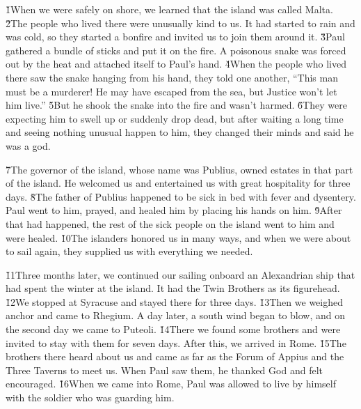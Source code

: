 \v{1}When we were safely on shore, we learned that the island was called Malta. \v{2}The people who lived there were unusually kind to us. It had started to rain and was cold, so they started a bonfire and invited us to join them around it. \v{3}Paul gathered a bundle of sticks and put it on the fire. A poisonous snake was forced out by the heat and attached itself to Paul's hand. \v{4}When the people who lived there saw the snake hanging from his hand, they told one another, ``This man must be a murderer! He may have escaped from the sea, but Justice won't let him live.'' \v{5}But he shook the snake into the fire and wasn't harmed. \v{6}They were expecting him to swell up or suddenly drop dead, but after waiting a long time and seeing nothing unusual happen to him, they changed their minds and said he was a god.

\v{7}The governor of the island, whose name was Publius, owned estates in that part of the island. He welcomed us and entertained us with great hospitality for three days. \v{8}The father of Publius happened to be sick in bed with fever and dysentery. Paul went to him, prayed, and healed him by placing his hands on him. \v{9}After that had happened, the rest of the sick people on the island went to him and were healed. \v{10}The islanders honored us in many ways, and when we were about to sail again, they supplied us with everything we needed.

\v{11}Three months later, we continued our sailing onboard an Alexandrian ship that had spent the winter at the island. It had the Twin Brothers as its figurehead. \v{12}We stopped at Syracuse and stayed there for three days. \v{13}Then we weighed anchor and came to Rhegium. A day later, a south wind began to blow, and on the second day we came to Puteoli. \v{14}There we found some brothers and were invited to stay with them for seven days. After this, we arrived in Rome. \v{15}The brothers there heard about us and came as far as the Forum of Appius and the Three Taverns to meet us. When Paul saw them, he thanked God and felt encouraged. \v{16}When we came into Rome, Paul was allowed to live by himself with the soldier who was guarding him.


